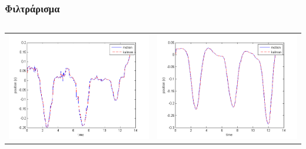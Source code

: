 \documentclass[8pt,sans,mathserif]{beamer}%
\begin{document}
\begin{frame}
\frametitle{Φιλτράρισμα}

    \begin{columns}
        \begin{tabular}{cc}
            \includegraphics[height = 0.23\textheight, keepaspectratio]{fig/filter0-x.png} & \includegraphics[height = 0.23\textheight, keepaspectratio]{fig/filter3-x.png}\\

\end{tabular}
\end{columns}
\end{frame}
\end{document}

